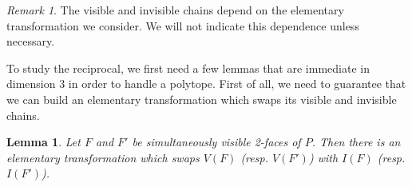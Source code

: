 \documentclass[12pt, notitlepage]{article}
\theoremstyle{plain}
\theoremstyle{definition}
\theoremstyle{plain}
\newtheorem{lemma}[thm]{Lemma}
\theoremstyle{remark}
\newtheorem*{rmk}{Remark}
\theoremstyle{plain}
\theoremstyle{plain}
\begin{document}
\begin{rmk}
    The visible and invisible chains depend on the elementary transformation we consider. We will not indicate this dependence unless necessary.
\end{rmk}

To study the reciprocal, we first need a few lemmas that are immediate in dimension 3 in order to handle a polytope. First of all, we need to guarantee that we can build an elementary transformation which swaps its visible and invisible chains.

\begin{lemma}  
    Let $F$ and $F'$ be simultaneously visible 2-faces of $P$. Then there is an elementary transformation which swaps $V(F)$ (resp. $V(F')$) with $I(F)$ (resp. $I(F')$).
\end{lemma}
\end{document}
